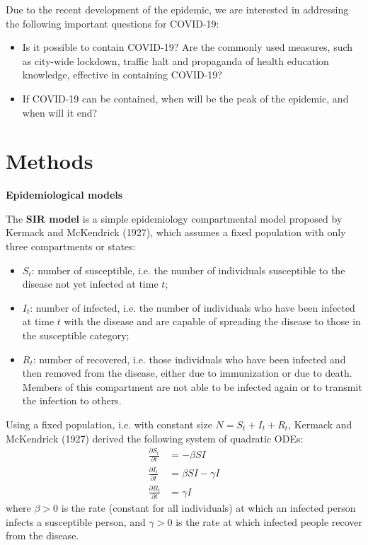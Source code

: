 \documentclass[12pt]{article}
\begin{document}
Due to the recent development of the epidemic, we are interested in addressing the following important questions for COVID-19:
\begin{itemize}
\setlength\itemsep{0.01em}
\item Is it possible to contain COVID-19? Are the commonly used measures, such as city-wide lockdown, traffic halt and propaganda of health education knowledge, effective in containing COVID-19? 
\item If COVID-19 can be contained, when will be the peak of the epidemic, and when will it end?  
\end{itemize}

\clearpage

\section{Methods}

\begin{flushleft}
\textbf{Epidemiological models}
\end{flushleft}

The \textbf{SIR model} is a simple epidemiology compartmental model proposed by Kermack and McKendrick (1927), which assumes a fixed population with only three compartments or states:
\begin{itemize}
\setlength\itemsep{0.01em}
\item $S_t$: number of susceptible, i.e. the number of individuals susceptible to the disease not yet infected at time $t$;
\item $I_t$: number of infected, i.e. the number of individuals who have been infected at time $t$ with the disease and are capable of spreading the disease to those in the susceptible category;
\item $R_t$: number of recovered, i.e. those individuals who have been infected and then removed from the disease, either due to immunization or due to death. Members of this compartment are not able to be infected again or to transmit the infection to others.
\end{itemize}
Using a fixed population, i.e. with constant size $N=S_t+I_t+R_t$, Kermack and McKendrick (1927) derived the following system of quadratic ODEs:
\begin{equation}
\begin{split}
\frac{\partial S_t}{\partial t}&=-\beta SI \\[1ex]
\frac{\partial I_t}{\partial t}&=\beta SI-\gamma I \\[1ex]
\frac{\partial R_t}{\partial t}&=\gamma I 
\end{split}
\end{equation}
where $\beta>0$ is the rate (constant for all individuals) at which an infected person infects a susceptible person, and $\gamma>0$ is the rate at which infected people recover from the disease.
\end{document}
